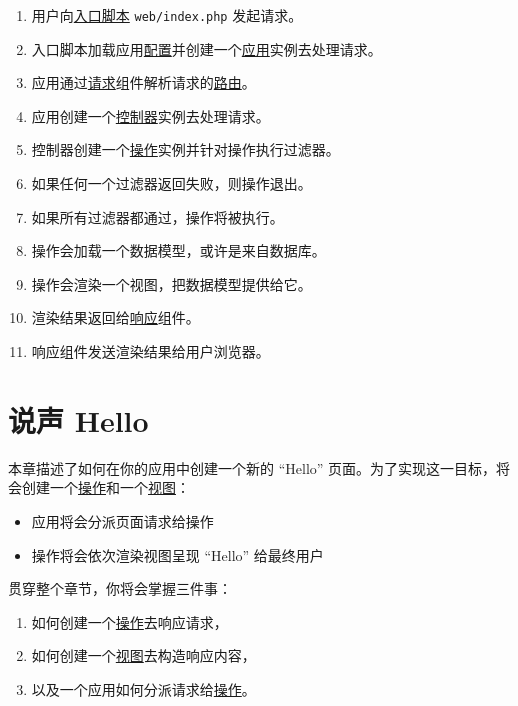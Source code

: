\begin{enumerate}
\item 用户向\hyperref[structure-entry-scripts.md]{入口脚本} \lstinline|web/index.php| 发起请求。
\item 入口脚本加载应用\hyperref[concept-configurations.md]{配置}并创建一个\hyperref[structure-applications.md]{应用}实例去处理请求。
\item 应用通过\hyperref[runtime-request.md]{请求}组件解析请求的\hyperref[runtime-routing.md]{路由}。
\item 应用创建一个\hyperref[structure-controllers.md]{控制器}实例去处理请求。
\item 控制器创建一个\hyperref[structure-controllers.md]{操作}实例并针对操作执行过滤器。
\item 如果任何一个过滤器返回失败，则操作退出。
\item 如果所有过滤器都通过，操作将被执行。
\item 操作会加载一个数据模型，或许是来自数据库。
\item 操作会渲染一个视图，把数据模型提供给它。
\item 渲染结果返回给\hyperref[runtime-responses.md]{响应}组件。
\item 响应组件发送渲染结果给用户浏览器。
\end{enumerate}


\label{start-hello.md}\section{说声 Hello}
本章描述了如何在你的应用中创建一个新的 “Hello” 页面。为了实现这一目标，将会创建一个\hyperref[structure-controllers.md::creating-actions]{操作}和一个\hyperref[structure-views.md]{视图}：

\begin{itemize}
\item 应用将会分派页面请求给操作
\item 操作将会依次渲染视图呈现 “Hello” 给最终用户
\end{itemize}
贯穿整个章节，你将会掌握三件事：

\begin{enumerate}
\item 如何创建一个\hyperref[structure-controllers.md]{操作}去响应请求，
\item 如何创建一个\hyperref[structure-views.md]{视图}去构造响应内容，
\item 以及一个应用如何分派请求给\hyperref[structure-controllers.md::creating-actions]{操作}。
\end{enumerate}
